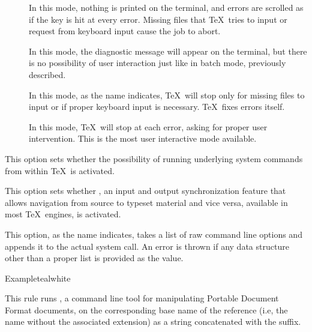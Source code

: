 \begin{description}
\begin{description}
\begin{description}
\item[] In this mode, nothing is printed on the terminal, and errors are scrolled as if the  key is hit at every error. Missing files that \TeX\ tries to input or request from keyboard input cause the job to abort.

\item[] In this mode, the diagnostic message will appear on the terminal, but there is no possibility of user interaction just like in batch mode, previously described.

\item[] In this mode, as the name indicates, \TeX\ will stop only for missing files to input or if proper keyboard input is necessary. \TeX\ fixes errors itself.

\item[] In this mode, \TeX\ will stop at each error, asking for proper user intervention. This is the most user interactive mode available.
\end{description}

\item[\rpsbox{shell}] This option sets whether the possibility of running underlying system commands from within \TeX\ is activated.

\item[\rpsbox{synctex}] This option sets whether , an input and output synchronization feature that allows navigation from source to typeset material and vice versa, available in most \TeX\ engines, is activated.

\item[\abox{options}] This option, as the name indicates, takes a list of raw command line options and appends it to the actual system call. An error is thrown if any data structure other than a proper list is provided as the value.
\end{description}

\begin{codebox}{Example}{teal}{\icnote}{white}
\end{codebox}

\item[\rulebox{pdftk}]
This rule runs , a command line tool for manipulating Portable Document Format documents, on the corresponding base name of the  reference (i.e, the name without the associated extension) as a string concatenated with the  suffix.


\end{description}
